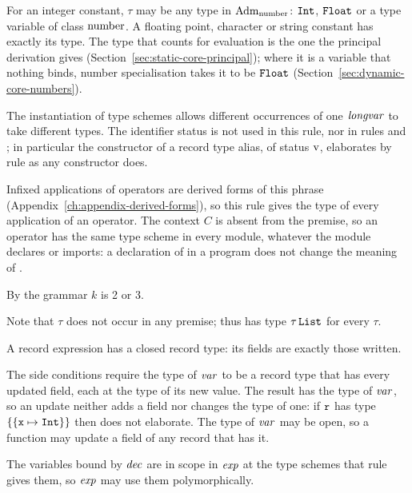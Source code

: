 \begin{rulecomments}
 For an integer constant, $\tau$ may be any type in
$\mathrm{Adm}_{\mathrm{number}}$: $\mathtt{Int}$, $\mathtt{Float}$ or a type variable of class $\mathrm{number}$. A
floating point, character or string constant has exactly its type. The type
that counts for evaluation is the one the principal derivation gives
(Section~\ref{sec:static-core-principal}); where it is a variable that nothing
binds, number specialisation takes it to be $\mathtt{Float}$
(Section~\ref{sec:dynamic-core-numbers}).

 The instantiation of type schemes allows different
occurrences of one $\mathit{longvar}$ to take different types. The identifier status is
not used in this rule, nor in rules  and
; in particular the constructor of a record type alias,
of status $\mathrm{v}$, elaborates by rule  as any
constructor does.

 Infixed applications of operators are derived forms of
this phrase (Appendix~\ref{ch:appendix-derived-forms}), so this rule gives the
type of every application of an operator. The context $C$ is absent from the
premise, so an operator has the same type scheme in every module, whatever the
module declares or imports: a declaration of  in a program does not
change the meaning of \kw{+}.

 By the grammar $k$ is 2 or 3.

 Note that $\tau$ does not occur in any premise; thus
\kw{[ ]} has type $\tau\,\mathtt{List}$ for every $\tau$.

 A record expression has a closed record type: its
fields are exactly those written.

 The side conditions require the type of $\mathit{var}$ to be
a record type that has every updated field, each at the type of its new
value. The result has the type of $\mathit{var}$, so an update neither adds a field
nor changes the type of one: if $\textnormal{\texttt{r}}$ has type $\{\{\textnormal{\texttt{x}} \mapsto
\mathtt{Int}\}\}$ then  does not elaborate. The type of
$\mathit{var}$ may be open, so a function may update a field of any record that has it.

 The variables bound by $\mathit{dec}$ are in scope in $\mathit{exp}$
at the type schemes that rule  gives them, so $\mathit{exp}$ may
use them polymorphically.
\end{rulecomments}

